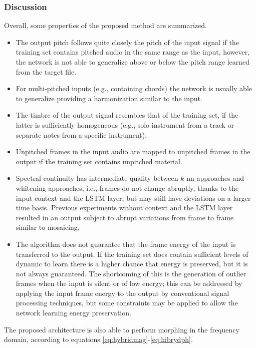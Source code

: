 \subsubsection{Discussion}
Overall, some properties of the proposed method are summarized.
\begin{itemize}
	\item The output pitch follows quite closely the pitch of the input signal if the training set contains pitched audio in the same range as the input, however, the network is not able to generalize above or below the pitch range learned from the target file.
	\item For multi-pitched inputs (e.g., containing chords) the network is usually able to generalize providing a harmonization similar to the input.
	\item The timbre of the output signal resembles that of the training set, if the latter is sufficiently homogeneous (e.g., solo instrument from a track or separate notes from a specific instrument).
	\item Unpitched frames in the input audio are mapped to unpitched frames in the output if the training set contains unpitched material.
	\item Spectral continuity has intermediate quality between $k$-nn approaches and whitening approaches, i.e., frames do not change abruptly, thanks to the input context and the LSTM layer, but may still have deviations on a larger time basis. Previous experiments without context and the LSTM layer resulted in an output subject to abrupt variations from frame to frame similar to mosaicing.

	\item The algorithm does not guarantee that the frame energy of the input is transferred to the output. If the training set does contain sufficient levels of dynamic to learn there is a higher chance that energy is preserved, but it is not always guaranteed. The shortcoming of this is the generation of outlier frames when the input is silent or of low energy; this can be addressed by applying the input frame energy to the output by conventional signal processing techniques, but some constraints may be applied to allow the network learning energy preservation.

\end{itemize}

The proposed architecture is also able to perform morphing in the frequency domain, according to equations \ref{eq:hybridmag}-\ref{eq:hibrydph}.


